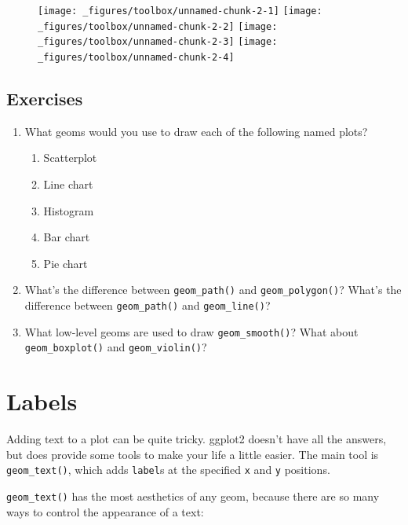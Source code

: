 \begin{figure}[H]
  \texttt{[image: \_figures/toolbox/unnamed-chunk-2-1]}%
  \texttt{[image: \_figures/toolbox/unnamed-chunk-2-2]}%
  \texttt{[image: \_figures/toolbox/unnamed-chunk-2-3]}%
  \texttt{[image: \_figures/toolbox/unnamed-chunk-2-4]}
\end{figure}

\subsection{Exercises}\label{exercises}

\begin{enumerate}
\def\labelenumi{\arabic{enumi}.}
\item
  What geoms would you use to draw each of the following named plots?

  \begin{enumerate}
  \def\labelenumii{\arabic{enumii}.}
  \tightlist
  \item
    Scatterplot
  \item
    Line chart
  \item
    Histogram
  \item
    Bar chart
  \item
    Pie chart
  \end{enumerate}
\item
  What's the difference between \texttt{geom\_path()} and
  \texttt{geom\_polygon()}? What's the difference between
  \texttt{geom\_path()} and \texttt{geom\_line()}?
\item
  What low-level geoms are used to draw \texttt{geom\_smooth()}? What
  about \texttt{geom\_boxplot()} and \texttt{geom\_violin()}?
\end{enumerate}

\hypertarget{sec:labelling}{\section{Labels}\label{sec:labelling}}

  

Adding text to a plot can be quite tricky. ggplot2 doesn't have all the
answers, but does provide some tools to make your life a little easier.
The main tool is \texttt{geom\_text()}, which adds \texttt{label}s at
the specified \texttt{x} and \texttt{y} positions.

\texttt{geom\_text()} has the most aesthetics of any geom, because there
are so many ways to control the appearance of a text:

